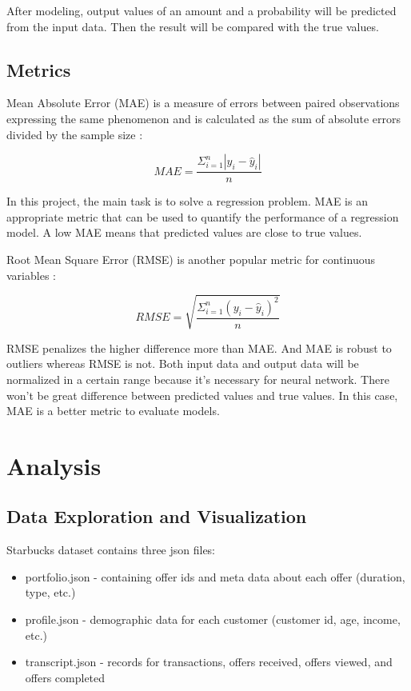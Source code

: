 \documentclass[a4paper,12pt]{article}
\begin{document}
After modeling, output values of an amount and a probability will be predicted from the input data. Then the result will be 
compared with the true values.

\subsection*{Metrics}

Mean Absolute Error (MAE) is a measure of errors between paired observations expressing the same phenomenon and is calculated 
as the sum of absolute errors divided by the sample size \cite{MAE}:

\begin{equation}
    MAE = \frac{\Sigma_{i=1}^{n}|y_{i} - \hat{y}_{i}|}{n}
\end{equation}

In this project, the main task is to solve a regression problem. MAE is an appropriate metric that can be used to quantify the 
performance of a regression model. A low MAE means that predicted values are close to true values.

Root Mean Square Error (RMSE) is another popular metric for continuous variables \cite{MAE/RMSE}:

\begin{equation}
    RMSE = \sqrt{\frac{\Sigma_{i=1}^{n}(y_{i} - \hat{y}_{i})^2}{n}}
\end{equation}

RMSE penalizes the higher difference more than MAE. And MAE is robust to outliers whereas RMSE is not. Both input data and 
output data will be normalized in a certain range because it's necessary for neural network. There won't be great difference 
between predicted values and true values. In this case, MAE is a better metric to evaluate models.

\section{Analysis}

\subsection*{Data Exploration and Visualization}

Starbucks dataset contains three json files:

\begin{itemize}

    \item portfolio.json - containing offer ids and meta data about each offer (duration, type, etc.)
    \item profile.json - demographic data for each customer (customer id, age, income, etc.)
    \item transcript.json - records for transactions, offers received, offers viewed, and offers completed

\end{itemize}
\end{document}

